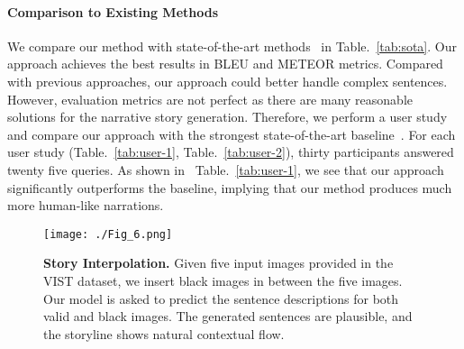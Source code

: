 \documentclass[letterpaper]{article} \usepackage{aaai20}  \usepackage{times}  \usepackage{helvet} \usepackage{courier}  \usepackage[hyphens]{url}  \usepackage{graphicx} \urlstyle{rm} \def\UrlFont{\rm}  \usepackage{graphicx}  \frenchspacing  \setlength{\pdfpagewidth}{8.5in}  \setlength{\pdfpageheight}{11in}
\newcommand{\tabref}[1]{Table.~\ref{#1}}
\begin{document}
\paragraph{Comparison to Existing Methods}
\quad

\noindent
We compare our method with state-of-the-art methods~\cite{huang2016visual,yu2017hierarchically,wang2018no,wang2019hierarchical,huang2019hierarchically} in \tabref{tab:sota}. Our approach achieves the best results in BLEU and METEOR metrics. Compared with previous approaches, our approach could better handle complex sentences. However,
evaluation metrics are not perfect as there are many reasonable solutions for the narrative story generation. Therefore, we perform a user study and compare our approach with the strongest state-of-the-art baseline~\cite{wang2018no}. For each user study (\tabref{tab:user-1}, \tabref{tab:user-2}), thirty participants answered twenty five queries.
As shown in ~\tabref{tab:user-1}, we see that our approach significantly outperforms the baseline, implying that our method produces much more human-like narrations.

\begin{table}
\centering
{}
\caption{\textbf{Baseline vs INet} without hiding in the test.  }
\label{tab:user-1}
\end{table}

\begin{table}
\centering
{}
\caption{\textbf{ INet vs $\text{INet}_{\text{hidden}}$.} In inference stage, we compare the story generated by INet with and without hidden images.}
\label{tab:user-2}
\end{table}

\begin{figure*}[t]
\centering
\texttt{[image: ./Fig\_6.png]}
\caption{\textbf{Story Interpolation.} Given five input images provided in the VIST dataset, we insert black images in between the five images. Our model is asked to predict the sentence descriptions for both valid and black images. The generated sentences are plausible, and the storyline shows natural contextual flow.}
\label{fig:interpolation}
\end{figure*}
\end{document}
